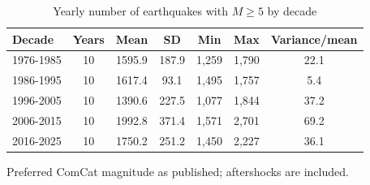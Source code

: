 \begin{table}[t]
\centering
\begin{threeparttable}
\caption{Yearly number of earthquakes with $M\geq 5$ by decade}
\label{tab:counts_m5}
\begin{tabular}{lcccccc}
\toprule
Decade & Years & Mean & SD & Min & Max & Variance/mean \\
\midrule
1976-1985 & 10 & 1595.9 & 187.9 & 1,259 & 1,790 & 22.1 \\
1986-1995 & 10 & 1617.4 & 93.1 & 1,495 & 1,757 & 5.4 \\
1996-2005 & 10 & 1390.6 & 227.5 & 1,077 & 1,844 & 37.2 \\
2006-2015 & 10 & 1992.8 & 371.4 & 1,571 & 2,701 & 69.2 \\
2016-2025 & 10 & 1750.2 & 251.2 & 1,450 & 2,227 & 36.1 \\
\bottomrule
\end{tabular}
\begin{tablenotes}[flushleft]
\footnotesize
\item Preferred ComCat magnitude as published; aftershocks are included.
\end{tablenotes}
\end{threeparttable}
\end{table}
